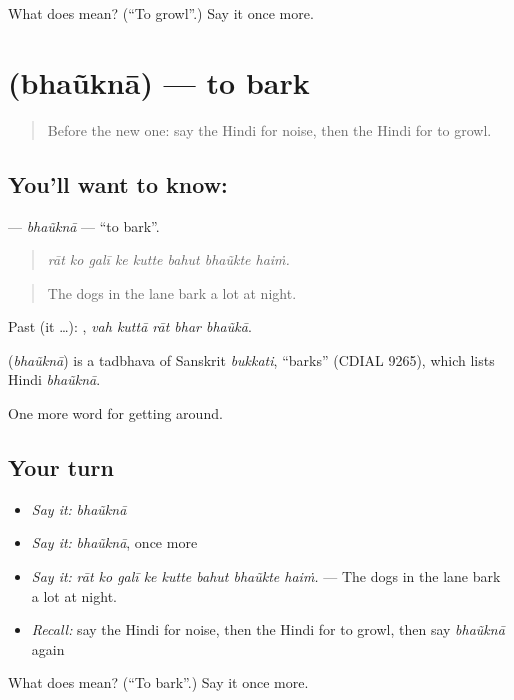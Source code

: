 \begin{tcolorbox}[breakable,colback=teal!4,colframe=teal!35!black,title={Before you move on}]
What does  mean? (\textquotedblleft{}To growl\textquotedblright{}.) Say it once more.
\end{tcolorbox}
\section[\texorpdfstring{\hi{भौंकना} (bhaũknā)}{भौंकना (bhaũknā)}]{ (bhaũknā) — to bark}

\label{lesson:HI-C423-bhaukna}



\begin{quote}
Before the new one: say the Hindi for noise, then the Hindi for to growl.
\end{quote}

\subsection*{You'll want to know: }
\textbf{} — \emph{bhaũknā} — \textquotedblleft{}to bark\textquotedblright{}.

\begin{quote}
       
\end{quote}

\begin{quote}
\emph{rāt ko galī ke kutte bahut bhaũkte haiṁ.}
\end{quote}

\begin{quote}
The dogs in the lane bark a lot at night.
\end{quote}

Past (it …):     , \emph{vah kuttā rāt bhar bhaũkā}.

\begin{cousinweb}
\textbf{} (\emph{bhaũknā}) is a tadbhava of Sanskrit \emph{bukkati}, \textquotedblleft{}barks\textquotedblright{} (CDIAL 9265), which lists Hindi \emph{bhaũknā}.
\end{cousinweb}

\begin{grammarlens}[title={What you've built}]
One more word for getting around.
\end{grammarlens}

\subsection*{Your turn}
\begin{itemize}
\raggedright
  \item \emph{Say it:} \emph{bhaũknā}
  \item \emph{Say it:} \emph{bhaũknā}, once more
  \item \emph{Say it:} \emph{rāt ko galī ke kutte bahut bhaũkte haiṁ.} — The dogs in the lane bark a lot at night.
  \item \emph{Recall:} say the Hindi for noise, then the Hindi for to growl, then say \emph{bhaũknā} again
\end{itemize}

\begin{tcolorbox}[breakable,colback=teal!4,colframe=teal!35!black,title={Before you move on}]
What does  mean? (\textquotedblleft{}To bark\textquotedblright{}.) Say it once more.
\end{tcolorbox}
